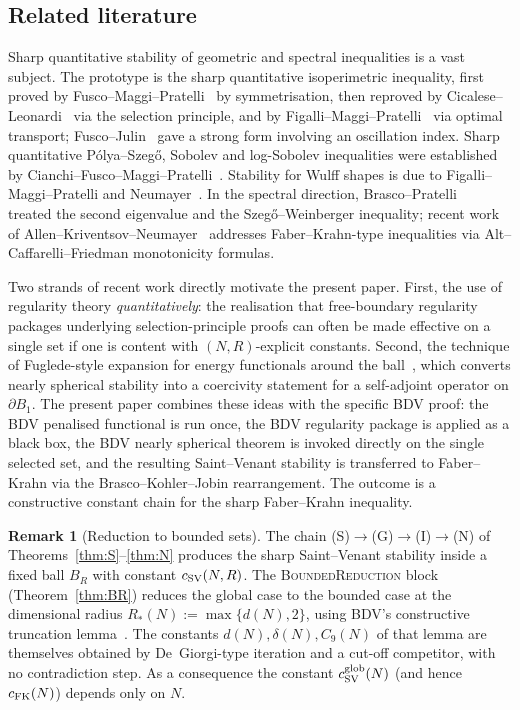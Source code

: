 \documentclass[11pt]{article}
\theoremstyle{definition}
\newtheorem{remark}[theorem]{Remark}
\begin{document}
\subsection{Related literature}\label{ssec:related}

Sharp quantitative stability of geometric and spectral inequalities
is a vast subject. The prototype is the sharp quantitative
isoperimetric inequality, first proved by
Fusco--Maggi--Pratelli~\cite{FMP} by symmetrisation, then reproved by
Cicalese--Leonardi~\cite{CL2012} via the selection principle, and by
Figalli--Maggi--Pratelli~\cite{FigalliMaggiPratelli} via optimal
transport; Fusco--Julin~\cite{FuscoJulin} gave a strong form involving
an oscillation index. Sharp quantitative
P\'olya--Szeg\H{o}, Sobolev and log-Sobolev inequalities were
established by Cianchi--Fusco--Maggi--Pratelli~\cite{CFMP}. Stability
for Wulff shapes is due to Figalli--Maggi--Pratelli and
Neumayer~\cite{NeumayerWulff}. In the spectral direction,
Brasco--Pratelli~\cite{BrascoPratelli} treated the second eigenvalue
and the Szeg\H{o}--Weinberger inequality; recent work of
Allen--Kriventsov--Neumayer~\cite{AKN} addresses Faber--Krahn-type
inequalities via Alt--Caffarelli--Friedman monotonicity formulas.

Two strands of recent work directly motivate the present paper.
First, the use of regularity theory \emph{quantitatively}: the
realisation that free-boundary regularity packages underlying
selection-principle proofs can often be made effective on a single
set if one is content with $(N,R)$-explicit constants. Second, the
technique of Fuglede-style expansion for energy functionals around
the ball~\cite{Fuglede,AFM,BDV}, which converts nearly spherical
stability into a coercivity statement for a self-adjoint operator on
$\partial B_1$. The present paper combines these ideas with the
specific BDV proof: the BDV penalised functional is run once, the BDV
regularity package is applied as a black box, the BDV nearly
spherical theorem is invoked directly on the single selected set,
and the resulting Saint--Venant stability is transferred to
Faber--Krahn via the Brasco--Kohler--Jobin rearrangement. The outcome
is a constructive constant chain for the sharp Faber--Krahn
inequality.

\begin{remark}[Reduction to bounded sets]
The chain (S)$\to$(G)$\to$(I)$\to$(N) of
Theorems~\ref{thm:S}--\ref{thm:N} produces the sharp Saint--Venant
stability inside a fixed ball $B_R$ with constant $c_{\rm SV}(N,R)$.
The \textsc{BoundedReduction} block (Theorem~\ref{thm:BR}) reduces
the global case to the bounded case at the dimensional radius
$R_{*}(N):=\max\{d(N),2\}$, using BDV's constructive truncation
lemma~\cite[Lemma~5.3]{BDV}. The constants $d(N),\delta(N),C_{9}(N)$
of that lemma are themselves obtained by De~Giorgi-type iteration and
a cut-off competitor, with no contradiction step. As a consequence
the constant $c_{\rm SV}^{\rm glob}(N)$ (and hence $c_{\rm FK}(N)$)
depends only on $N$.
\end{remark}
\end{document}
